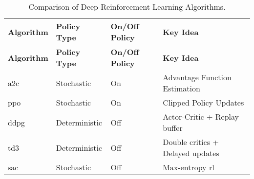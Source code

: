 \begin{longtable}{|l|l|l|l|}
    \caption{Comparison of Deep Reinforcement Learning Algorithms.}
    \label{tab:drl_algorithms_comparison}
    \\ 
    \hline
    \textbf{Algorithm} & \textbf{Policy Type} & \textbf{On/Off Policy} & \textbf{Key Idea} \\ \midrule
    \endfirsthead

    \hline
    \textbf{Algorithm} & \textbf{Policy Type} & \textbf{On/Off Policy} & \textbf{Key Idea} \\ \midrule
    \endhead

    \endfoot

    \hline
    \acrshort{a2c} & Stochastic & On & Advantage Function Estimation \\ \hline
    \acrshort{ppo} & Stochastic & On & Clipped Policy Updates \\ \hline
    \acrshort{ddpg} & Deterministic & Off & Actor-Critic + Replay buffer \\ \hline
    \acrshort{td3} & Deterministic & Off & Double critics + Delayed updates \\ \hline
    \acrshort{sac} & Stochastic & Off & Max-entropy \acrshort{rl} \\ \hline
\end{longtable}